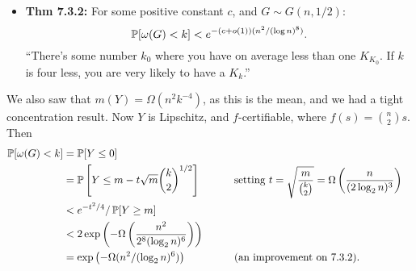 \documentclass[11pt]{article}
\newenvironment{INT}[1][]{\begin{itemize}\small\item\textbf{#1}}{\end{itemize}}
\begin{document}
\begin{chapter7}
\begin{itemise}
\begin{INT}[Thm 7.3.2:]
For some positive constant $c$, and $G\sim G(n,1/2)$:
\[\operatorname{\mathbb{P}}[\omega(G)<k]<e^{-(c+o(1))(n^2/(\log n)^8)}.\]
``There's some number $k_0$ where you have on average less than one $K_{K_0}$. If $k$ is four less, you are very likely to have a $K_k$.''
\end{INT}
We also saw that $m(Y)=\Omega(n^2k^{-4})$, as this is the mean, and we had a tight concentration result. Now $Y$ is Lipschitz, and $f$-certifiable, where $f(s)={n\choose2}s$. Then
\begin{alignat*}{2}
\Prob[\omega(G)<k]&=\Prob[Y\leq 0]%
\\&=\Prob\left[Y\leq m-t\sqrt m{k\choose 2}^{1/2}\right]&\qquad&\text{setting $t=\sqrt {\frac{m}{{k\choose2}}}=\Omega\left(\frac{n}{(2\log_2n)^3}\right)$}
\\&<e^{-t^2/4}/\Prob[Y\geq m]%
\\&<2\exp\left(-\Omega\left(\frac{n^2}{2^8(\log_2n)^6}\right)\right)%
\\&=\exp\left(-\Omega(n^2/(\log_2n)^6)\right)&\qquad&\text{(an improvement on 7.3.2).}
\end{alignat*}
\end{itemise}
\end{chapter7}
\end{document}
